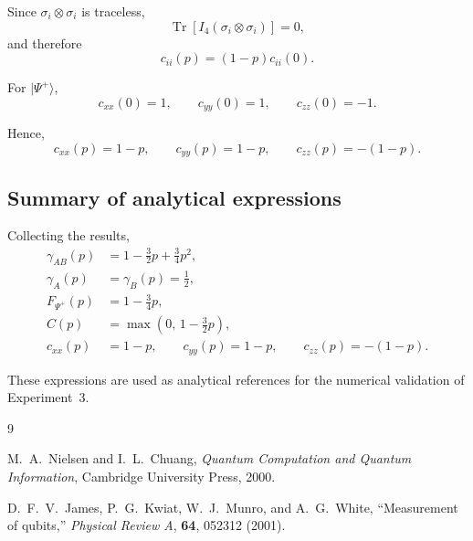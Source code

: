 \documentclass[a4paper]{article}
\begin{document}
Since \( \sigma_i\otimes\sigma_i \) is traceless,
\[
\operatorname{Tr}\!\left[I_4(\sigma_i\otimes\sigma_i)\right]
=
0,
\]
and therefore
\[
c_{ii}(p)=(1-p)c_{ii}(0).
\]

For \( |\Psi^+\rangle \),
\[
c_{xx}(0)=1,
\qquad
c_{yy}(0)=1,
\qquad
c_{zz}(0)=-1.
\]

Hence,
\[
c_{xx}(p)=1-p,
\qquad
c_{yy}(p)=1-p,
\qquad
c_{zz}(p)=-(1-p).
\]


\subsection*{Summary of analytical expressions}

Collecting the results,
\[
\boxed{
\begin{aligned}
\gamma_{AB}(p) &= 1-\frac{3}{2}p+\frac{3}{4}p^2, \\
\gamma_A(p) &= \gamma_B(p)=\frac12, \\
F_{\Psi^+}(p) &= 1-\frac34 p, \\
C(p) &= \max\left(0,\,1-\frac32 p\right), \\
c_{xx}(p) &= 1-p,\qquad
c_{yy}(p)=1-p,\qquad
c_{zz}(p)=-(1-p).
\end{aligned}
}
\]

These expressions are used as analytical references for the numerical validation of Experiment~3.



\begin{thebibliography}{9}

M.~A.~Nielsen and I.~L.~Chuang,  
\textit{Quantum Computation and Quantum Information},  
Cambridge University Press, 2000.

D.~F.~V.~James, P.~G.~Kwiat, W.~J.~Munro, and A.~G.~White,  
``Measurement of qubits,''  
\textit{Physical Review A}, \textbf{64}, 052312 (2001).

\end{thebibliography}
\end{document}

